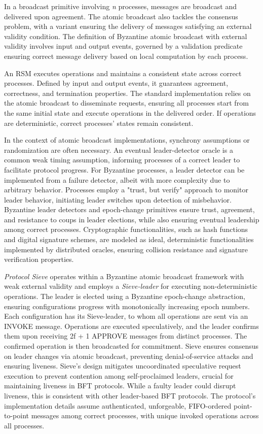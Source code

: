 \documentclass{scrartcl}
\begin{document}
In a broadcast primitive involving \textit{n} processes, messages are broadcast and delivered upon agreement. The atomic broadcast also tackles the consensus problem, with a variant ensuring the delivery of messages satisfying an external validity condition. The definition of Byzantine atomic broadcast with external validity involves input and output events, governed by a validation predicate ensuring correct message delivery based on local computation by each process.

An RSM executes operations and maintains a consistent state across correct processes. Defined by input and output events, it guarantees agreement, correctness, and termination properties. The standard implementation relies on the atomic broadcast to disseminate requests, ensuring all processes start from the same initial state and execute operations in the delivered order. If operations are deterministic, correct processes' states remain consistent.

In the context of atomic broadcast implementations, synchrony assumptions or randomization are often necessary. An eventual leader-detector oracle is a common weak timing assumption, informing processes of a correct leader to facilitate protocol progress. For Byzantine processes, a leader detector can be implemented from a failure detector, albeit with more complexity due to arbitrary behavior. Processes employ a "trust, but verify" approach to monitor leader behavior, initiating leader switches upon detection of misbehavior. Byzantine leader detectors and epoch-change primitives ensure trust, agreement, and resistance to coups in leader elections, while also ensuring eventual leadership among correct processes. Cryptographic functionalities, such as hash functions and digital signature schemes, are modeled as ideal, deterministic functionalities implemented by distributed oracles, ensuring collision resistance and signature verification properties.

\textit{Protocol Sieve} operates within a Byzantine atomic broadcast framework with weak external validity and employs a \textit{Sieve-leader} for executing non-deterministic operations. The leader is elected using a Byzantine epoch-change abstraction, ensuring configurations progress with monotonically increasing epoch numbers. Each configuration has its Sieve-leader, to whom all operations are sent via an INVOKE message. Operations are executed speculatively, and the leader confirms them upon receiving 2f + 1 APPROVE messages from distinct processes. The confirmed operation is then broadcasted for commitment. Sieve ensures consensus on leader changes via atomic broadcast, preventing denial-of-service attacks and ensuring liveness. Sieve's design mitigates uncoordinated speculative request execution to prevent contention among self-proclaimed leaders, crucial for maintaining liveness in BFT protocols. While a faulty leader could disrupt liveness, this is consistent with other leader-based BFT protocols. The protocol's implementation details assume authenticated, unforgeable, FIFO-ordered point-to-point messages among correct processes, with unique invoked operations across all processes.
\end{document}
